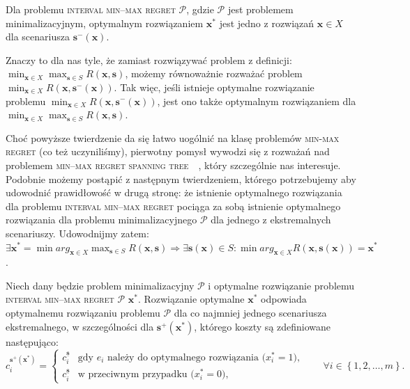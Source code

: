 \begin{corollary}
	Dla problemu \textsc{interval min--max regret $\mathcal{P}$}, gdzie $\mathcal{P}$ jest problemem minimalizacyjnym, optymalnym rozwiązaniem $\textbf{x}^{\ast}$ jest jedno z rozwiązań $\textbf{x} \in X$ dla scenariusza $\textbf{s}^{-} \left( \textbf{x} \right)$.
\end{corollary}

Znaczy to dla nas tyle, że zamiast rozwiązywać problem z definicji: $\min_{\textbf{x} \in X} \max_{\textbf{s} \in S} R \left( \textbf{x}, \textbf{s} \right)$, możemy równoważnie rozważać problem $\min_{\textbf{x} \in X} R \left( \textbf{x}, \textbf{s}^{-} \left( \textbf{x} \right) \right)$. Tak więc, jeśli istnieje optymalne rozwiązanie problemu $\min_{\textbf{x} \in X} R \left( \textbf{x}, \textbf{s}^{-} \left( \textbf{x} \right) \right)$, jest ono także optymalnym rozwiązaniem dla $\min_{\textbf{x} \in X} \max_{\textbf{s} \in S} R \left( \textbf{x}, \textbf{s} \right)$.

Choć powyższe twierdzenie da się łatwo uogólnić na klasę problemów \textsc{min-max regret} (co też uczyniliśmy), pierwotny pomysł wywodzi się z rozważań nad problemem \textsc{min--max regret spanning tree}~\cite[$429$--$430$]{minmaxSurvey}~\cite{robustSTP}, który szczególnie nas interesuje. Podobnie możemy postąpić z następnym twierdzeniem, którego potrzebujemy aby udowodnić prawidłowość w drugą stronę: że istnienie optymalnego rozwiązania dla problemu \textsc{interval min--max regret} pociąga za sobą istnienie optymalnego rozwiązania dla problemu minimalizacyjnego $\mathcal{P}$ dla jednego z ekstremalnych scenariuszy. Udowodnijmy zatem: $\exists \textbf{x}^{\ast} = \min arg_{\textbf{x} \in X} \max_{\textbf{s} \in S} R \left( \textbf{x}, \textbf{s} \right) \Rightarrow \exists \textbf{s} \left( \textbf{x} \right) \in S : \min arg_{\textbf{x} \in X} R \left( \textbf{x}, \textbf{s} \left( \textbf{x} \right) \right) = \textbf{x}^{\ast}$.

\begin{theorem}\label{th:intminmaxreg2}
	Niech dany będzie problem minimalizacyjny $\mathcal{P}$ i optymalne rozwiązanie problemu \textsc{interval min--max regret $\mathcal{P}$} $\textbf{x}^{\ast}$. Rozwiązanie optymalne $\textbf{x}^{\ast}$ odpowiada optymalnemu rozwiązaniu problemu $\mathcal{P}$ dla co najmniej jednego scenariusza ekstremalnego, w szczególności dla $\textbf{s}^{+} \left( \textbf{x}^{\ast} \right)$, którego koszty są zdefiniowane następująco:
	\begin{equation}
		c^{\textbf{s}^{+} \left( \textbf{x}^{\ast} \right)}_{i} = \left\{\begin{matrix}
			c^{\underline{\textbf{s}}}_{i} & \text{gdy $e_{i}$ należy do optymalnego rozwiązania ($x^{\ast}_{i} = 1$),}\\ 
			c^{\underline{\textbf{s}}}_{i} &  \text{w przeciwnym przypadku ($x^{\ast}_{i} = 0$),}
		\end{matrix}\right. \qquad \forall i \in \left\{ 1, 2, \dots, m \right\}\text{.}
	\end{equation}
\end{theorem}

